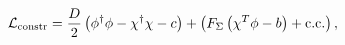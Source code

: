 \begin{equation}
 {\cal L}_{\rm constr} = 
{D \over 2}\left(\phi^\dagger \phi -\chi^\dagger \chi-c \right) 
+
\left(F_\Sigma \left(\chi^T\phi - b\right) +
{\rm c.c.}\right), 
\label{eq:N1U1constr-lag}
\end{equation}

